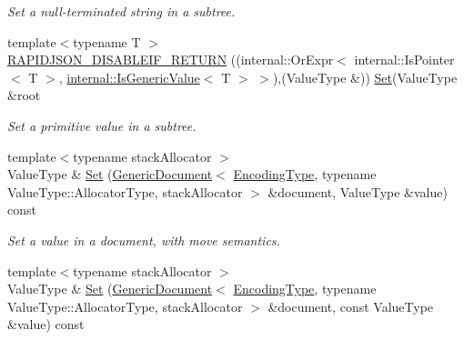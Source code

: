 \begin{DoxyCompactItemize}
\begin{DoxyCompactList}\small\item\em Set a null-\/terminated string in a subtree. \end{DoxyCompactList}\item 
{\footnotesize template$<$typename T $>$ }\\\hyperlink{classGenericPointer_a914bbdd96e2a248e035b8ebd68526369}{R\+A\+P\+I\+D\+J\+S\+O\+N\+\_\+\+D\+I\+S\+A\+B\+L\+E\+I\+F\+\_\+\+R\+E\+T\+U\+RN} ((internal\+::\+Or\+Expr$<$ internal\+::\+Is\+Pointer$<$ T $>$, \hyperlink{structinternal_1_1IsGenericValue}{internal\+::\+Is\+Generic\+Value}$<$ T $>$ $>$),(Value\+Type \&)) \hyperlink{classGenericPointer_adf0aa776e072b41d301e2a834ac2c2b5}{Set}(Value\+Type \&root
\begin{DoxyCompactList}\small\item\em Set a primitive value in a subtree. \end{DoxyCompactList}\item 
{\footnotesize template$<$typename stack\+Allocator $>$ }\\Value\+Type \& \hyperlink{classGenericPointer_a49e879bd98bddbe7300f152a070d5604}{Set} (\hyperlink{classGenericDocument}{Generic\+Document}$<$ \hyperlink{classGenericPointer_a4b802da797a7a0b615fd9611cedb7c3b}{Encoding\+Type}, typename Value\+Type\+::\+Allocator\+Type, stack\+Allocator $>$ \&document, Value\+Type \&value) const \hypertarget{classGenericPointer_a49e879bd98bddbe7300f152a070d5604}{}\label{classGenericPointer_a49e879bd98bddbe7300f152a070d5604}

\begin{DoxyCompactList}\small\item\em Set a value in a document, with move semantics. \end{DoxyCompactList}\item 
{\footnotesize template$<$typename stack\+Allocator $>$ }\\Value\+Type \& \hyperlink{classGenericPointer_afa59f450284e5cc6f989dab4b8344168}{Set} (\hyperlink{classGenericDocument}{Generic\+Document}$<$ \hyperlink{classGenericPointer_a4b802da797a7a0b615fd9611cedb7c3b}{Encoding\+Type}, typename Value\+Type\+::\+Allocator\+Type, stack\+Allocator $>$ \&document, const Value\+Type \&value) const \hypertarget{classGenericPointer_afa59f450284e5cc6f989dab4b8344168}{}\label{classGenericPointer_afa59f450284e5cc6f989dab4b8344168}


\end{DoxyCompactItemize}
